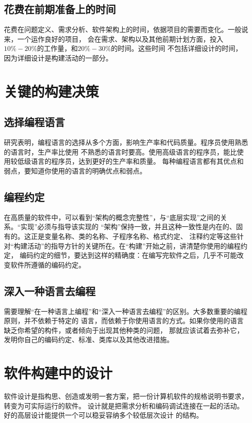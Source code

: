 \documentclass{article}
\begin{document}
\subsection{花费在前期准备上的时间}
花费在问题定义、需求分析、软件架构上的时间，依据项目的需要而变化。一般说来，一个运作良好的项目，
会在需求、架构以及其他前期计划方面，投入$10\%-20\%$的工作量，和$20\%-30\%$的时间。这些时间
不包括详细设计的时间，因为详细设计是构建活动的一部分。


\section{关键的构建决策}
\subsection{选择编程语言}
研究表明，编程语言的选择从多个方面，影响生产率和代码质量。程序员使用熟悉的语言时，生产率比使用
不熟悉的语言时要高。使用高级语言的程序员，能比使用较低级语言的程序员，达到更好的生产率和质量。
每种编程语言都有其优点和弱点，要知道你使用的语言的明确优点和弱点。

\subsection{编程约定}
在高质量的软件中，可以看到“架构的概念完整性”，与“底层实现”之间的关系。“实现”必须与指导该实现的
“架构”保持一致，并且这种一致性是内在的、固有的。这正是变量名称、类的名称、子程序名称、格式约定、
注释约定等这些针对“构建活动”的指导方针的关键所在。在“构建”开始之前，讲清楚你使用的编程约定，
编码约定的细节，要达到这样的精确度：在编写完软件之后，几乎不可能改变软件所遵循的编码约定。

\subsection{深入一种语言去编程}
需要理解“在一种语言上编程”和“深入一种语言去编程”的区别。大多数重要的编程原则，并不依赖于特定的
语言，而依赖于你使用语言的方式。如果你使用的语言缺乏你希望的构件，或者倾向于出现其他种类的问题，
那就应该试着去弥补它，发明你自己的编码约定、标准、类库以及其他改进措施。

\section{软件构建中的设计}
软件设计是指构思、创造或发明一套方案，把一份计算机软件的规格说明书要求，转变为可实际运行的软件。
设计就是把需求分析和编码调试连接在一起的活动。好的高层设计能提供一个可以稳妥容纳多个较低层次设计
的结构。
\end{document}
